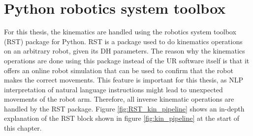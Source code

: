 \section{Python robotics system toolbox}\label{sec:Kinematics_pyrst}
For this thesis, the kinematics are handled using the robotics system toolbox (RST) package for Python.
RST is a package used to do kinematics operations on an arbitrary robot, given its DH parameters.
The reason why the kinematics operations are done using this package instead of the UR software itself is that it offers an online robot simulation that can be used to confirm that the robot makes the correct movements. This feature is important for this thesis, as NLP interpretation of natural language instructions might lead to unexpected movements of the robot arm. Therefore, all inverse kinematic operations are handled by the RST package. Figure \ref{fig:RST_kin_pipeline} shows an in-depth explanation of the RST block shown in figure \ref{fig:kin_pipeline} at the start of this chapter.


